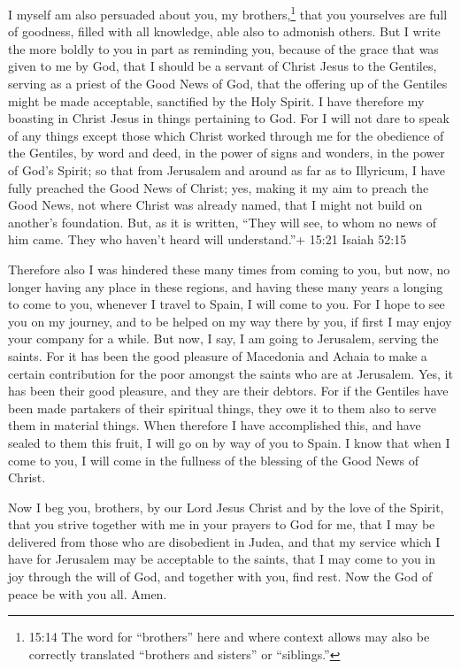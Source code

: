  I myself am also persuaded about you, my
brothers,\footnote{15:14 The word for ``brothers'' here and where
  context allows may also be correctly translated ``brothers and
  sisters'' or ``siblings.''} that you yourselves are full of goodness,
filled with all knowledge, able also to admonish others. 
But I write the more boldly to you in part as reminding you, because of
the grace that was given to me by God,  that I should be a
servant of Christ Jesus to the Gentiles, serving as a priest of the Good
News of God, that the offering up of the Gentiles might be made
acceptable, sanctified by the Holy Spirit.  I have
therefore my boasting in Christ Jesus in things pertaining to God.
 For I will not dare to speak of any things except those
which Christ worked through me for the obedience of the Gentiles, by
word and deed,  in the power of signs and wonders, in the
power of God's Spirit; so that from Jerusalem and around as far as to
Illyricum, I have fully preached the Good News of Christ; 
yes, making it my aim to preach the Good News, not where Christ was
already named, that I might not build on another's foundation.
 But, as it is written, ``They will see, to whom no news of
him came. They who haven't heard will understand.''+ 15:21 Isaiah 52:15

 Therefore also I was hindered these many times from coming
to you,  but now, no longer having any place in these
regions, and having these many years a longing to come to you,
 whenever I travel to Spain, I will come to you. For I hope
to see you on my journey, and to be helped on my way there by you, if
first I may enjoy your company for a while.  But now, I
say, I am going to Jerusalem, serving the saints.  For it
has been the good pleasure of Macedonia and Achaia to make a certain
contribution for the poor amongst the saints who are at Jerusalem.
 Yes, it has been their good pleasure, and they are their
debtors. For if the Gentiles have been made partakers of their spiritual
things, they owe it to them also to serve them in material things.
 When therefore I have accomplished this, and have sealed
to them this fruit, I will go on by way of you to Spain.  I
know that when I come to you, I will come in the fullness of the
blessing of the Good News of Christ.

 Now I beg you, brothers, by our Lord Jesus Christ and by
the love of the Spirit, that you strive together with me in your prayers
to God for me,  that I may be delivered from those who are
disobedient in Judea, and that my service which I have for Jerusalem may
be acceptable to the saints,  that I may come to you in joy
through the will of God, and together with you, find rest. 
Now the God of peace be with you all. Amen.

